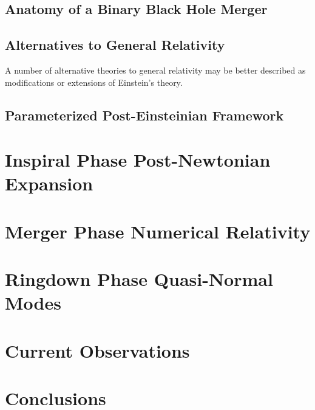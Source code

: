 \documentclass[aps,prd,twocolumn,floatfix,preprintnumbers,altaffilletter,superscriptaddress]{revtex4-1}
\begin{document}
\subsection{Anatomy of a Binary Black Hole Merger} \label{sec:intro_anatomy-bbh}

\subsection{Alternatives to General Relativity} \label{sec:intro_alt-theories}
A number of alternative theories to general relativity may be better described as modifications or extensions of Einstein's theory. 


\subsection{Parameterized Post-Einsteinian Framework} \label{sec:intro_ppE}

\section{Inspiral Phase Post-Newtonian Expansion} \label{sec:inspiral_pn_expansion}

\section{Merger Phase Numerical Relativity} \label{sec:nr_merger}

\section{Ringdown Phase Quasi-Normal Modes} \label{sec:ringdown_qnms}

\section{Current Observations} \label{sec:current_obsv}

\section{Conclusions} \label{sec:conclusion}

\end{document}
